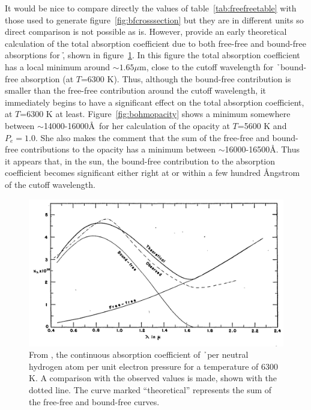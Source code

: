 It would be nice to compare directly the values of table~\ref{tab:freefreetable} with those used to generate figure~\ref{fig:bfcrosssection} but they are in different units so direct comparison is not possible as is.  However, \cite{chandra1946} provide an early theoretical calculation of the total absorption coefficient due to both free-free and bound-free absorptions for \h, shown in figure~\ref{fig:chandratotal}.  In this figure the total absorption coefficient has a local minimum around $\sim1.65\mu$m, close to the cutoff wavelength for \h\ bound-free absorption (at $T$=6300 K).  Thus, although the bound-free contribution is smaller than the free-free contribution around the cutoff wavelength, it immediately begins to have a significant effect on the total absorption coefficient, at $T$=6300 K at least.  Figure~\ref{fig:bohmopacity} shows a minimum somewhere between $\sim$14000-16000\AA\ for her calculation of the opacity at $T$=5600 K and $P_e=1.0$.  She also makes the comment that the sum of the free-free and bound-free contributions to the opacity has a minimum between $\sim$16000-16500\AA. Thus it appears that, in the sun, the bound-free contribution to the absorption coefficient becomes significant either right at or within a few hundred \AA ngstrom of the cutoff wavelength.
\begin{figure}
\includegraphics[width=\linewidth]{figs/chandraopacity.png}
\caption{\label{fig:chandratotal}From \cite{chandra1946}, the continuous absorption coefficient of \h\ per neutral hydrogen atom per unit electron pressure for a temperature of 6300 K.  A comparison with the observed values is made, shown with the dotted line.  The curve marked ``theoretical'' represents the sum of the free-free and bound-free curves.}
\end{figure}

